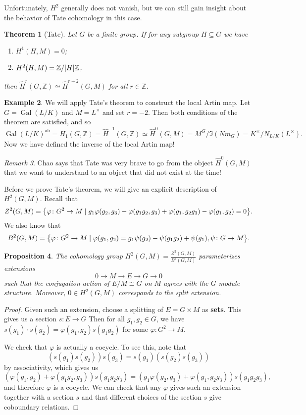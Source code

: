 \documentclass[leqno, openany]{memoir}
\newtheorem{thm}{Theorem}[section]
\newtheorem{prop}[thm]{Proposition}
\theoremstyle{definition}
\newtheorem{exm}[thm]{Example}
\theoremstyle{remark}
\newtheorem{rmk}[thm]{Remark}
\theoremstyle{plain}
\theoremstyle{definition}
\theoremstyle{remark}
\newcommand{\Z}{\mathbb{Z}}
\newcommand{\mr}[1]{\mathrm{#1}}
\newcommand{\wh}[1]{\widehat{#1}}
\DeclareMathOperator{\Gal}{Gal}
\begin{document}
Unfortunately, $H^2$ generally does not vanish, but we can still gain insight
about the behavior of Tate cohomology in this case.

\begin{thm}[Tate] Let $G$ be a finite group. If for any subgroup $H \subseteq
G$ we have \begin{enumerate} \item $H^1(H, M) = 0$; \item $H^2(H, M) =
\Z/\abs{H} \Z$, \end{enumerate} then $\wh{H}^r(G, \Z) \simeq \wh{H}^{r+2}(G,
M)$ for all $r \in \Z$.
\end{thm}

\begin{exm} We will apply Tate's theorem to construct the local Artin map. Let
    $G = \Gal(L/K)$ and $M = L^{\times}$ and set $r = -2$. Then both conditions
    of the theorem are satisfied, and so \[ {\Gal(L/K)}^{\mr{ab}} = H_1(G, \Z)
    = \wh{H}^{-1}(G, \Z) \simeq \wh{H}^0(G, M) = M^G / \Im (Nm_G) = K^{\times}
/ N_{L/K}(L^{\times}). \] Now we have defined the inverse of the local Artin
map!  \end{exm}

\begin{rmk} Chao says that Tate was very brave to go from the object
$\wh{H}^0(G, M)$ that we want to understand to an object that did not exist at
the time!  \end{rmk}

Before we prove Tate's theorem, we will give an explicit description of $H^2(G,
M)$. Recall that \[ Z^2(G, M) = \qty{\varphi \colon G^2 \to M \mid g_1
\varphi(g_2, g_3) - \varphi(g_1g_2, g_3) + \varphi(g_1, g_2g_3) - \varphi(g_1,
g_2) = 0}. \] We also know that \[ B^2(G, M) = \qty{\varphi \colon G^2 \to M
\mid \varphi(g_1, g_2) = g_1 \psi(g_2) - \psi(g_1g_2) + \psi(g_1), \psi \colon
G \to M}. \] \begin{prop} The cohomology group $H^2(G, M) = \frac{Z^2(G,
M)}{B^2(G, M)}$ parameterizes extensions \[ 0 \to M \to E \to G \to 0 \] such
that the conjugation action of $E/M \cong G$ on $M$ agrees with the $G$-module
structure. Moreover, $0 \in H^2(G, M)$ corresponds to the split extension.
\end{prop}

\begin{proof} Given such an extension, choose a splitting of $E = G \times M$
    as \textbf{sets}. This gives us a section $s \colon E \to G$ Then for all
    $g_1, g_2 \in G$, we have $s(g_1) \cdot s(g_2) = \varphi(g_1,g_2)
    s(g_1g_2)$ for some $\varphi \colon G^2 \to M$.

    We check that $\varphi$ is actually a cocycle. To see this, note that \[
        (s(g_1) s(g_2))s(g_3) = s(g_1) (s(g_2) s(g_3)) \] by associativity,
        which gives us \[ ( \varphi(g_1,g_2) + \varphi(g_1g_2, g_3) )
        s(g_1g_2g_3) = (g_1 \varphi(g_2,g_3) + \varphi(g_1,g_2g_3))
    s(g_1g_2g_3), \] and therefore $\varphi$ is a cocycle. We can check that
any $\varphi$ gives such an extension together with a section $s$ and that
different choices of the section $s$ give coboundary relations.  \end{proof}
\end{document}

